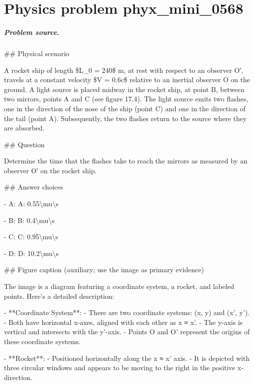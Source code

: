 
\chapter{Physics problem phyx\_mini\_0568}
\label{ch:PhyXMiniProblems_problem_phyx_mini_0568}

\paragraph{Problem source.}
\#\# Physical scenario

A rocket ship of length \$L\_0 = 240\$ m, at rest with respect to an observer O′, travels at a constant velocity \$V = 0.6c\$ relative to an inertial observer O on the ground. A light source is placed midway in the rocket ship, at point B, between two mirrors, points A and C (see figure 17.4). The light source emits two flashes, one in the direction of the nose of the ship (point C) and one in the direction of the tail (point A). Subsequently, the two flashes return to the source where they are absorbed.

\#\# Question

Determine the time that the flashes take to reach the mirrors as measured by an observer O′ on the rocket ship.

\#\# Answer choices

- A: A: 0.55\textbackslash{}mu\textbackslash{}s

- B: B: 0.4\textbackslash{}mu\textbackslash{}s

- C: C: 0.95\textbackslash{}mu\textbackslash{}s

- D: D: 10.2\textbackslash{}mu\textbackslash{}s

\#\# Figure caption (auxiliary; use the image as primary evidence)

The image is a diagram featuring a coordinate system, a rocket, and labeled points. Here's a detailed description:

- **Coordinate System**: 
  - There are two coordinate systems: (x, y) and (x', y').
  - Both have horizontal x-axes, aligned with each other as x ≡ x'.
  - The y-axis is vertical and intersects with the y'-axis.
  - Points O and O' represent the origins of these coordinate systems.

- **Rocket**:
  - Positioned horizontally along the x ≡ x' axis.
  - It is depicted with three circular windows and appears to be moving to the right in the positive x-direction.

